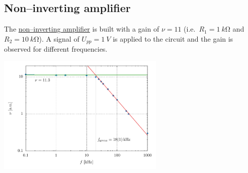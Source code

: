 \documentclass[a4paper,10pt]{article}
\newenvironment{Figure}
        {\par\medskip\noindent\minipage{\linewidth}}
        {\endminipage\par\medskip}
\numberwithin{equation}{section}
\begin{document}
\begin{multicols}{2}
	\subsection{Non--inverting amplifier}
	The \hyperref[fig:non--inverting amplifier]{non--inverting amplifier} is built with a gain of $\nu =11$ (i.e.\ $R_1=\SI{1}{k\ohm}$ and $R_2=\SI{10}{k\ohm}$).
	A signal of $U_{p p}=\SI{1}{V}$ is applied to the circuit and the gain is observed for different frequencies.
	\begin{Figure}
		\centering
		\includegraphics[width=0.6\textwidth]{../plot/5_1_2_crop.pdf}
	\end{Figure}


\end{multicols}
\end{document}
